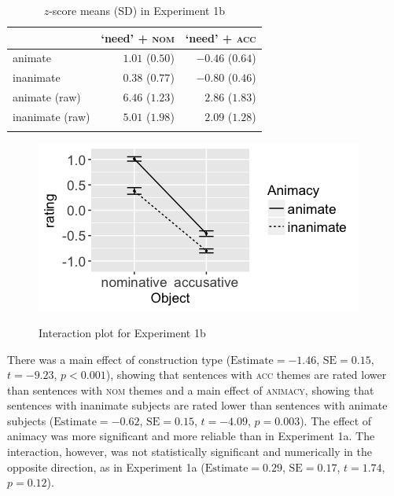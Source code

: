 \documentclass[output=paper,colorlinks,citecolor=brown]{langscibook}
\begin{document}

\begin{table}
\centering
\begin{tabularx}{0.65\textwidth}{Xrr}
\lsptoprule
   & `need' + \textsc{nom} & `need' + \textsc{acc}\\
\midrule
animate  &  $1.01$ ($0.50$) &   $-0.46$ ($0.64$)\\
inanimate  & $0.38$ ($0.77$) &   $-0.80$ ($0.46$)\\
animate (raw)  &   $6.46$ ($1.23$) &  $2.86$ ($1.83$)\\
inanimate (raw)  &   $5.01$ ($1.98$) & $2.09$ ($1.28$)\\
\lspbottomrule
\end{tabularx}
\caption{$z$-score means (SD) in Experiment 1b}
\label{tab:1:means-exp1b}
\end{table}

\begin{figure}
\caption{Interaction plot for Experiment 1b}
\centering
\includegraphics[scale = 0.5]{figures/exp1b_13.png}
\label{fig:exp1b}
\end{figure}

There was a main effect of construction type ($\text{Estimate} = -1.46$, $\text{SE} = 0.15$, $t = -9.23$, $p < 0.001$), showing that sentences with \textsc{acc} themes are rated lower than sentences with \textsc{nom} themes and a main effect of \textsc{animacy}, showing that sentences with inanimate subjects are rated lower than sentences with animate subjects ($\text{Estimate} = -0.62$, $\text{SE} = 0.15$, $t = -4.09$, $p = 0.003$). The effect of animacy was more significant and more reliable than in Experiment 1a. The interaction, however, was not statistically significant and numerically in the opposite direction, as in Experiment 1a ($\text{Estimate} = 0.29$, $\text{SE} = 0.17$, $t = 1.74$, $p = 0.12$).
\end{document}

